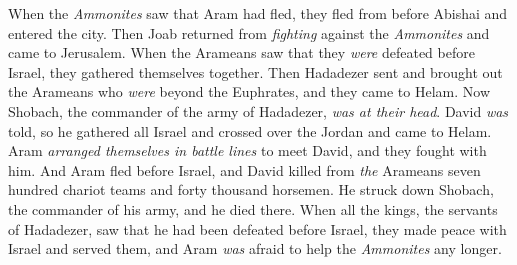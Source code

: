 \begin{biblechapter}
\verse When the \textit{Ammonites} saw that Aram had fled, they fled from before Abishai and entered the city. Then Joab returned from \textit{fighting} against the \textit{Ammonites} and came to Jerusalem.
 When the Arameans saw that they \textit{were} defeated before Israel, they gathered themselves together.
\verse Then Hadadezer sent and brought out the Arameans who \textit{were} beyond the Euphrates, and they came to Helam. Now Shobach, the commander of the army of Hadadezer, \textit{was at their head}.
\verse David \textit{was} told, so he gathered all Israel and crossed over the Jordan and came to Helam. Aram \textit{arranged themselves in battle lines} to meet David, and they fought with him.
\verse And Aram fled before Israel, and David killed from \textit{the} Arameans seven hundred chariot teams and forty thousand horsemen. He struck down Shobach, the commander of his army, and he died there.
\verse When all the kings, the servants of Hadadezer, saw that he had been defeated before Israel, they made peace with Israel and served them, and Aram \textit{was} afraid to help the \textit{Ammonites} any longer.
\end{biblechapter}

